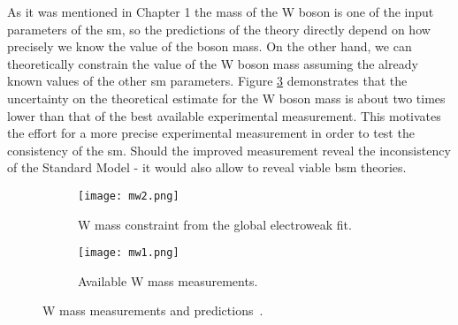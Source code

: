     As it was mentioned in Chapter 1 the mass of the W boson is one of the input parameters of the \gls{sm}, so the predictions of the theory directly depend on how precisely we know the value of the boson mass. On the other hand, we can theoretically constrain the value of the W boson mass assuming the already known values of the other \gls{sm} parameters. Figure \ref{fig::w_values} demonstrates that the uncertainty on the theoretical estimate for the W boson mass is about two times lower than that of the best available experimental measurement. This motivates the effort for a more precise experimental measurement in order to test the consistency of the \gls{sm}. Should the improved measurement reveal the inconsistency of the Standard Model - it would also allow to reveal viable \gls{bsm} theories. 
    	\begin{figure}[htbp]
    	\begin{subfigure}[t]{0.48\textwidth}
    		\texttt{[image: mw2.png]}
    		\caption[Side view]{W mass constraint from the global electroweak fit.}
    		\label{fig::w_constraint}
    	\end{subfigure}
    	\hfill
    	\begin{subfigure}[t]{0.48\textwidth} 
    		\texttt{[image: mw1.png]}
    		\caption[Transverse view]{Available W mass measurements.}
    		\label{fig::w_measurement}
    	\end{subfigure}
    	\caption{W mass measurements and predictions~\cite{wboson}.}
    	\label{fig::w_values}
    \end{figure}
